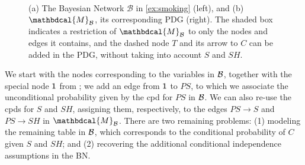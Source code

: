\documentclass[letterpaper]{article} %
\newcommand\cmergearr[4]{
		\draw[arr,-] (#1) -- (#4) -- (#2);
		\draw[arr, shorten <=0] (#4) -- (#3);
	}
\newcommand\mergearr[3]{
		\coordinate (center-#1#2#3) at (barycentric cs:#1=1,#2=1,#3=1.2);
		\cmergearr{#1}{#2}{#3}{center-#1#2#3}
	}
\theoremstyle{plain}
\theoremstyle{definition}
\theoremstyle{remark}
\newcounter{subfigure}
\newcommand{\dg}[1]{\mathbdcal{#1}}
\newcommand{\var}[1]{\mathsf{#1}}
\newcommand{\PDGof}[1]{{\dg M}_{#1}}
\begin{document}
\begin{example}[emulating a BN]
\begin{figure}[ht!]
\fi
	\hfill~
	\label{subfig:smoking-pdg}
\addtocounter{figure}{-1}
\caption{ (a) The Bayesian Network $\mathcal B$ in \cref{ex:smoking} (left), and
(b) $\PDGof{\mathcal B}$, its corresponding PDG (right). The shaded box
indicates a restriction of $\PDGof{\mathcal B}$ to only the nodes and edges it
contains, and the dashed node $T$ and its arrow to $C$ can be added in the PDG,
without taking into account $S$ and $SH$.}
\label{fig:smoking-bn+pdg}
\end{figure}

We start with the nodes corresponding to the variables in $\cal B$, together
with the special node $\sf 1$ from ; we add an edge
from ${\sf 1}$ to $\mathit{PS}$, to which we associate the unconditional
probability given by the cpd for $\mathit{PS}$ in $\cal B$. We can also re-use
the cpds for $S$ and $\mathit{SH}$, assigning them, respectively, to the edges
$PS \to S$ and $PS \to SH$ in $\PDGof{{\mathcal B}}$.
There are two remaining problems: (1) modeling the remaining table in $\cal B$,
which corresponds to the conditional probability of $C$ given $S$ and $SH$; and
(2) recovering the additional
conditional
independence assumptions in the BN. 


\end{example}
\end{document}
